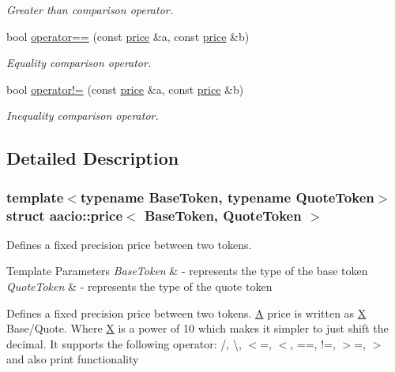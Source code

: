 \begin{DoxyCompactItemize}
\begin{DoxyCompactList}\small\item\em Greater than comparison operator. \end{DoxyCompactList}\item 
bool \mbox{\hyperlink{structaacio_1_1price_a64a97e029f909397f7e93ae9f18c0f92}{operator==}} (const \mbox{\hyperlink{structaacio_1_1price}{price}} \&a, const \mbox{\hyperlink{structaacio_1_1price}{price}} \&b)
\begin{DoxyCompactList}\small\item\em Equality comparison operator. \end{DoxyCompactList}\item 
bool \mbox{\hyperlink{structaacio_1_1price_afb4eb2338acf95c043151f4f35b99432}{operator!=}} (const \mbox{\hyperlink{structaacio_1_1price}{price}} \&a, const \mbox{\hyperlink{structaacio_1_1price}{price}} \&b)
\begin{DoxyCompactList}\small\item\em Inequality comparison operator. \end{DoxyCompactList}\end{DoxyCompactItemize}


\subsection{Detailed Description}
\subsubsection*{template$<$typename Base\+Token, typename Quote\+Token$>$\newline
struct aacio\+::price$<$ Base\+Token, Quote\+Token $>$}

Defines a fixed precision price between two tokens. 


\begin{DoxyTemplParams}{Template Parameters}
{\em Base\+Token} & -\/ represents the type of the base token \\
\hline
{\em Quote\+Token} & -\/ represents the type of the quote token\\
\hline
\end{DoxyTemplParams}
Defines a fixed precision price between two tokens. \mbox{\hyperlink{struct_a}{A}} price is written as \mbox{\hyperlink{class_x}{X}} Base/\+Quote. Where \mbox{\hyperlink{class_x}{X}} is a power of 10 which makes it simpler to just shift the decimal. It supports the following operator\+: /, \textbackslash{}, $<$=, $<$, ==, !=, $>$=, $>$ and also print functionality


